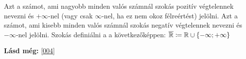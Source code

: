 \begin{note4}
Azt a számot, ami nagyobb minden valós számnál szokás pozitív végtelennek
nevezni és $+\infty$-nel (vagy csak $\infty$-nel, ha ez nem okoz félreértést)
jelölni. Azt a számot, ami kisebb minden valós számnál szokás negatív
végtelennek nevezni és $-\infty$-nel jelölni. Szokás definiálni a
 a következőképpen:
$\overline{\mathbb{R}} \coloneqq \mathbb{R} \cup \{-\infty; +\infty\}$
\end{note4}

\textbf{Lásd még:} \ref{004}
